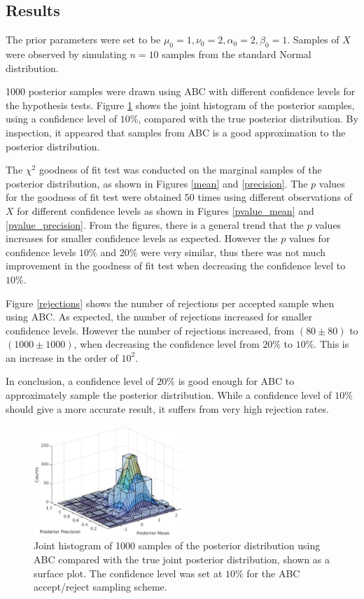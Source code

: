 \documentclass[a4paper,10pt]{article}
\begin{document}
\subsection{Results}
The prior parameters were set to be $\mu_0=1,\nu_0=2,\alpha_0=2,\beta_0=1$. Samples of $X$ were observed by simulating $n=10$ samples from the standard Normal distribution.

1000 posterior samples were drawn using ABC with different confidence levels for the hypothesis tests. Figure \ref{surf} shows the joint histogram of the posterior samples, using a confidence level of $10\%$, compared with the true posterior distribution. By inspection, it appeared that samples from ABC is a good approximation to the posterior distribution.

The $\chi^2$ goodness of fit test was conducted on the marginal samples of the posterior distribution, as shown in Figures \ref{mean} and \ref{precision}. The $p$ values for the goodness of fit test were obtained 50 times using different observations of $X$ for different confidence levels as shown in Figures \ref{pvalue_mean} and \ref{pvalue_precision}. From the figures, there is a general trend that the $p$ values increases for smaller confidence levels as expected. However the $p$ values for confidence levels $10\%$ and $20\%$ were very similar, thus there was not much improvement in the goodness of fit test when decreasing the confidence level to $10\%.$

Figure \ref{rejections} shows the number of rejections per accepted sample when using ABC. As expected, the number of rejections increased for smaller confidence levels. However the number of rejections increased, from $(80\pm80)$ to $(1000\pm1000)$, when decreasing the confidence level from $20\%$ to $10\%$. This is an increase in the order of $10^2$.

In conclusion, a confidence level of $20\%$ is good enough for ABC to approximately sample the posterior distribution. While a confidence level of $10\%$ should give a more accurate result, it suffers from very high rejection rates.

\begin{figure}
\centering
\includegraphics[width=0.5\textwidth]{surf.eps}
\caption{Joint histogram of 1000 samples of the posterior distribution using ABC compared with the true joint posterior distribution, shown as a surface plot. The confidence level was set at $10\%$ for the ABC accept/reject sampling scheme.}
\label{surf}
\end{figure}
\end{document}
